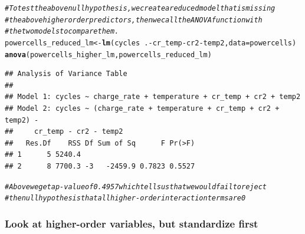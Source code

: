 \documentclass{article}\usepackage[]{graphicx}\usepackage[]{color}
\makeatletter
\newcommand{\hlcom}[1]{\textcolor[rgb]{0.678,0.584,0.686}{\textit{#1}}}%
\newcommand{\hlopt}[1]{\textcolor[rgb]{0,0,0}{#1}}%
\newcommand{\hlstd}[1]{\textcolor[rgb]{0.345,0.345,0.345}{#1}}%
\newcommand{\hlkwb}[1]{\textcolor[rgb]{0.69,0.353,0.396}{#1}}%
\newcommand{\hlkwc}[1]{\textcolor[rgb]{0.333,0.667,0.333}{#1}}%
\newcommand{\hlkwd}[1]{\textcolor[rgb]{0.737,0.353,0.396}{\textbf{#1}}}%
\newenvironment{kframe}{%
 \def\at@end@of@kframe{}%
 \ifinner\ifhmode%
  \def\at@end@of@kframe{\end{minipage}}%
  \begin{minipage}{\columnwidth}%
 \fi\fi%
 \def\FrameCommand##1{\hskip\@totalleftmargin \hskip-\fboxsep
 \colorbox{shadecolor}{##1}\hskip-\fboxsep
     \hskip-\linewidth \hskip-\@totalleftmargin \hskip\columnwidth}%
 \MakeFramed {\advance\hsize-\width
   \@totalleftmargin\z@ \linewidth\hsize
   \@setminipage}}%
 {\par\unskip\endMakeFramed%
 \at@end@of@kframe}
\newenvironment{knitrout}{}{} %
\makeatother
\begin{document}
\begin{knitrout}
\begin{kframe}
\begin{alltt}
\hlcom{# To test the above null hypothesis, we create a reduced model that is missing}
\hlcom{# the above higher order predictors, then we call the ANOVA function with}
\hlcom{# the two models to compare them.}
\hlstd{powercells_reduced_lm} \hlkwb{<-} \hlkwd{lm}\hlstd{(cycles} \hlopt{~} \hlstd{.} \hlopt{-}\hlstd{cr_temp} \hlopt{-}\hlstd{cr2} \hlopt{-}\hlstd{temp2,} \hlkwc{data} \hlstd{= powercells)}
\hlkwd{anova}\hlstd{(powercells_higher_lm, powercells_reduced_lm)}
\end{alltt}
\begin{verbatim}
## Analysis of Variance Table
## 
## Model 1: cycles ~ charge_rate + temperature + cr_temp + cr2 + temp2
## Model 2: cycles ~ (charge_rate + temperature + cr_temp + cr2 + temp2) - 
##     cr_temp - cr2 - temp2
##   Res.Df    RSS Df Sum of Sq      F Pr(>F)
## 1      5 5240.4                           
## 2      8 7700.3 -3   -2459.9 0.7823 0.5527
\end{verbatim}
\begin{alltt}
\hlcom{# Above we get a p-value of 0.4957 which tells us that we would fail to reject}
\hlcom{# the null hypothesis that all higher-order interaction terms are 0}
\end{alltt}
\end{kframe}
\end{knitrout}

\subsubsection*{Look at higher-order variables, but standardize first}
\end{document}
